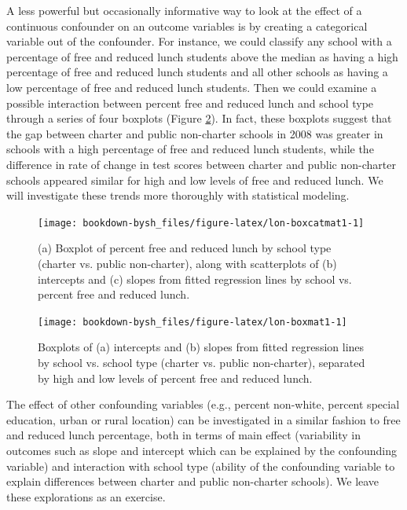 \documentclass[
]{krantz}
\begin{document}
A less powerful but occasionally informative way to look at the effect of a continuous confounder on an outcome variables is by creating a categorical variable out of the confounder. For instance, we could classify any school with a percentage of free and reduced lunch students above the median as having a high percentage of free and reduced lunch students and all other schools as having a low percentage of free and reduced lunch students. Then we could examine a possible interaction between percent free and reduced lunch and school type through a series of four boxplots (Figure \ref{fig:lon-boxmat1}). In fact, these boxplots suggest that the gap between charter and public non-charter schools in 2008 was greater in schools with a high percentage of free and reduced lunch students, while the difference in rate of change in test scores between charter and public non-charter schools appeared similar for high and low levels of free and reduced lunch. We will investigate these trends more thoroughly with statistical modeling.

\begin{figure}

{\centering \texttt{[image: bookdown-bysh\_files/figure-latex/lon-boxcatmat1-1]} 

}

\caption{(a) Boxplot of percent free and reduced lunch by school type (charter vs. public non-charter), along with scatterplots of (b) intercepts and (c) slopes from fitted regression lines by school vs. percent free and reduced lunch.}\label{fig:lon-boxcatmat1}
\end{figure}

\begin{figure}

{\centering \texttt{[image: bookdown-bysh\_files/figure-latex/lon-boxmat1-1]} 

}

\caption{Boxplots of (a) intercepts and (b) slopes from fitted regression lines by school vs. school type (charter vs. public non-charter), separated by high and low levels of percent free and reduced lunch.}\label{fig:lon-boxmat1}
\end{figure}

The effect of other confounding variables (e.g., percent non-white, percent special education, urban or rural location) can be investigated in a similar fashion to free and reduced lunch percentage, both in terms of main effect (variability in outcomes such as slope and intercept which can be explained by the confounding variable) and interaction with school type (ability of the confounding variable to explain differences between charter and public non-charter schools). We leave these explorations as an exercise.
\end{document}
